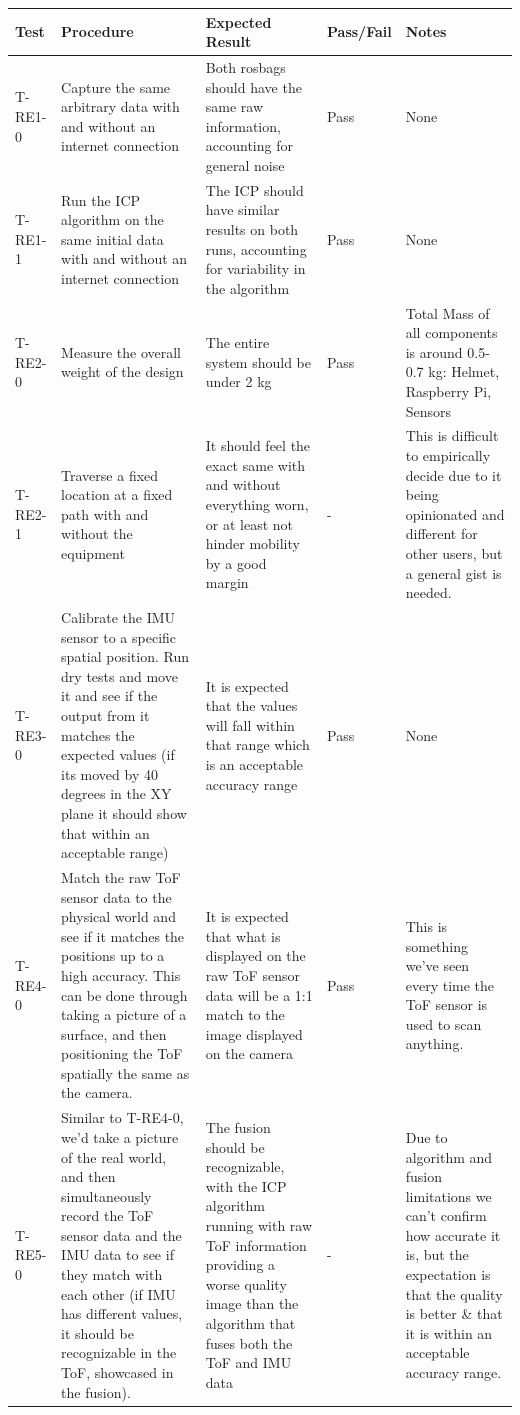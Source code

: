 \documentclass[11pt]{article}
\begin{document}
	\begin{tabularx}{\textwidth}{X p{} p{} X p{}}
		\toprule
		\textbf{Test} & \textbf{Procedure} & \textbf{Expected Result} & \textbf{Pass/Fail} & \textbf{Notes} \\
		\midrule
		T-RE1-0 & Capture the same arbitrary data with and without an internet connection & Both rosbags should have the same raw information, accounting for general noise & Pass & None\\
		\midrule
		T-RE1-1 & Run the ICP algorithm on the same initial data with and without an internet connection & The ICP should have similar results on both runs, accounting for variability in the algorithm & Pass & None \\
		\midrule
		T-RE2-0 & Measure the overall weight of the design & The entire system should be under 2 kg & Pass & Total Mass of all components is around 0.5-0.7 kg: Helmet, Raspberry Pi, Sensors \\
		\midrule
		T-RE2-1 & Traverse a fixed location at a fixed path with and without the equipment & It should feel the exact same with and without everything worn, or at least not hinder mobility by a good margin & - & This is difficult to empirically decide due to it being opinionated and different for other users, but a general gist is needed. \\
        \midrule 
        T-RE3-0 & Calibrate the IMU sensor to a specific spatial position. Run dry tests and move it and see if the output from it matches the expected values (if its moved by 40 degrees in the XY plane it should show that within an acceptable range) & It is expected that the values will fall within that range which is an acceptable accuracy range & Pass & None \\
        \midrule
        T-RE4-0 & Match the raw ToF sensor data to the physical world and see if it matches the positions up to a high accuracy. This can be done through taking a picture of a surface, and then positioning the ToF spatially the same as the camera. & It is expected that what is displayed on the raw ToF sensor data will be a 1:1 match to the image displayed on the camera & Pass & This is something we've seen every time the ToF sensor is used to scan anything. \\
        \midrule
        T-RE5-0 & Similar to T-RE4-0, we'd take a picture of the real world, and then simultaneously record the ToF sensor data and the IMU data to see if they match with each other (if IMU has different values, it should be recognizable in the ToF, showcased in the fusion). & The fusion should be recognizable, with the ICP algorithm running with raw ToF information providing a worse quality image than the algorithm that fuses both the ToF and IMU data & - & Due to algorithm and fusion limitations we can't confirm how accurate it is, but the expectation is that the quality is better \& that it is within an acceptable accuracy range. \\

\end{tabularx}
\end{document}
